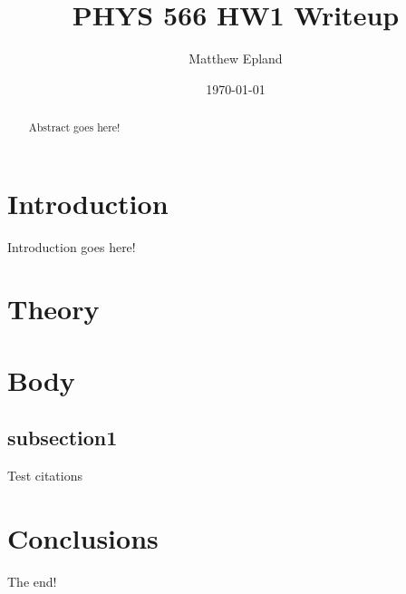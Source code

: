 \documentclass[aps,prd,twocolumn,nofootinbib]{revtex4-1}
\begin{document}
\title{PHYS 566 HW1 Writeup}
\author{Matthew Epland}


\date{\today}

\begin{abstract}
Abstract goes here!
\end{abstract}\maketitle

\section{Introduction}
\label{sec:intro}
Introduction goes here!

\section{Theory}
\label{sec:theory}

\section{Body}
\label{sec:body}


\subsection{subsection1}
Test citations~\cite{Winklmeier} ~\cite{ref_1} ~\cite{ref_2}

\section{Conclusions}
The end!




\end{document}
